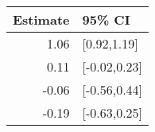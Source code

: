 \begin{tabular}{rl}
  \hline
Estimate & 95\% CI \\ 
  \hline
1.06 & [0.92,1.19] \\ 
  0.11 & [-0.02,0.23] \\ 
  -0.06 & [-0.56,0.44] \\ 
  -0.19 & [-0.63,0.25] \\ 
   \hline
\end{tabular}

